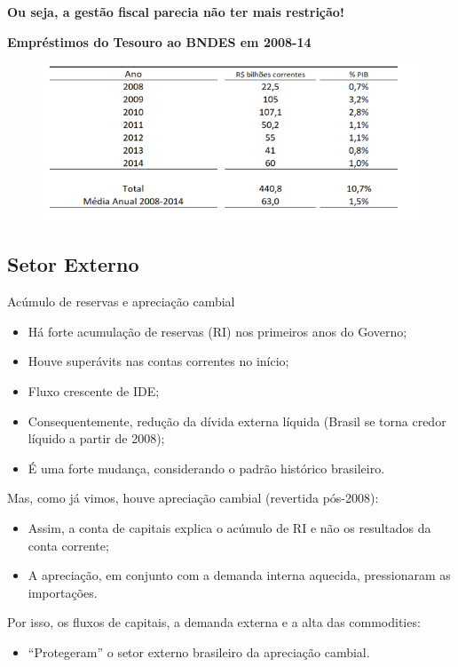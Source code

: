 \documentclass[a4paper,12pt]{article}[abntex2]
\begin{document}
\textbf{Ou seja, a gestão fiscal parecia não ter mais restrição!}

\textbf{Empréstimos do Tesouro ao BNDES em 2008-14 }

\begin{figure}[H]
    \centering
    \includegraphics[width=0.7\linewidth]{Imagens/a17i1.png}
\end{figure}

\subsection{\textbf{Setor Externo}}
Acúmulo de reservas e apreciação cambial\begin{itemize}
    \item Há forte acumulação de reservas (RI) nos primeiros anos do Governo;
    \item Houve superávits nas contas correntes no início;
    \item Fluxo crescente de IDE;
    \item Consequentemente, redução da dívida externa líquida (Brasil se torna credor líquido a partir de 2008);
    \item É uma forte mudança, considerando o padrão histórico brasileiro.
\end{itemize}

Mas, como já vimos, houve apreciação cambial (revertida pós-2008):\begin{itemize}
    \item Assim, a conta de capitais explica o acúmulo de RI e não os resultados da conta corrente;
    \item A apreciação, em conjunto com a demanda interna aquecida, pressionaram as importações.
\end{itemize}

Por isso, os fluxos de capitais, a demanda externa e a alta das commodities:\begin{itemize}
    \item ``Protegeram'' o setor externo brasileiro da apreciação cambial.
\end{itemize}
\end{document}
